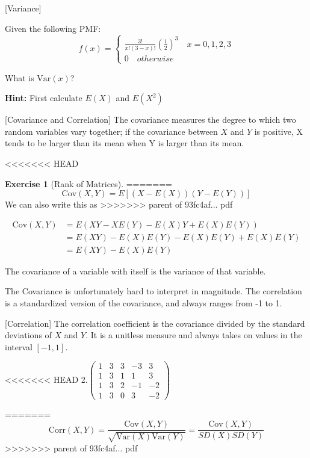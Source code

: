 \documentclass[]{book}
\theoremstyle{definition}
\theoremstyle{definition}
\theoremstyle{definition}
\newtheorem{exercise}{Exercise}[chapter]
\theoremstyle{remark}
\begin{document}
[Variance]
\protect\hypertarget{exm:var}{}{\label{exm:var} {} }

Given the following PMF:
\[f(x) =  \begin{cases}
              \frac{3!}{x!(3-x)!}(\frac{1}{2})^3 \quad x = 0,1,2,3\\
               0 \quad otherwise
            \end{cases}
               \]

What is \(\text{Var}(x)\)?

\textbf{Hint:} First calculate \(E(X)\) and \(E(X^2)\)

[Covariance and Correlation]
\protect\hypertarget{def:unnamed-chunk-85}{}{\label{def:unnamed-chunk-85} {} }
The covariance measures the degree to which two random variables vary together; if the covariance between \(X\) and \(Y\) is positive, X tends to be larger than its mean when Y is larger than its mean.

<<<<<<< HEAD
\begin{exercise}[Rank of Matrices]
\protect\hypertarget{exr:rank}{}{\label{exr:rank} {} }
=======
\[\text{Cov}(X,Y) = E[(X - E(X))(Y - E(Y))] \]
We can also write this as
>>>>>>> parent of 93fc4af... pdf

\begin{align*}
\text{Cov}(X,Y) &= E\left(XY - XE(Y) - E(X)Y + E(X)E(Y)\right)\\
&= E(XY) - E(X)E(Y) - E(X)E(Y) + E(X)E(Y)\\
&= E(XY) - E(X)E(Y)
\end{align*}

The covariance of a variable with itself is the variance of that variable.

The Covariance is unfortunately hard to interpret in magnitude. The correlation is a standardized version of the covariance, and always ranges from -1 to 1.

[Correlation]
\protect\hypertarget{def:unnamed-chunk-86}{}{\label{def:unnamed-chunk-86} {} }The correlation coefficient is the covariance divided by the standard deviations of \(X\) and \(Y\). It is a unitless measure and always takes on values in the interval \([-1,1]\).

<<<<<<< HEAD
2.\(\begin{pmatrix} 1 & 3 & 3 & -3 & 3\\ 1 & 3 & 1 & 1 & 3 \\ 1 & 3 & 2 & -1 & -2 \\ 1 & 3 & 0 & 3 & -2 \end{pmatrix}\)
\end{exercise}
=======
\[\text{Corr}(X, Y) = \frac{\text{Cov}(X,Y)}{\sqrt{\text{Var}(X)\text{Var}(Y)}} = \frac{\text{Cov}(X,Y)}{SD(X)SD(Y)}\]
>>>>>>> parent of 93fc4af... pdf
\end{document}
